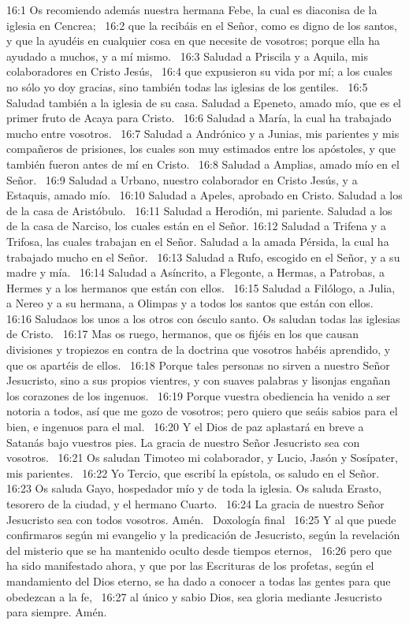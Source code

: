 16:1 Os recomiendo además nuestra hermana Febe, la cual es diaconisa de la iglesia en Cencrea;  
16:2 que la recibáis en el Señor, como es digno de los santos, y que la ayudéis en cualquier cosa en que necesite de vosotros; porque ella ha ayudado a muchos, y a mí mismo.  
16:3 Saludad a Priscila y a Aquila, mis colaboradores en Cristo Jesús,  
16:4 que expusieron su vida por mí; a los cuales no sólo yo doy gracias, sino también todas las iglesias de los gentiles.  
16:5 Saludad también a la iglesia de su casa. Saludad a Epeneto, amado mío, que es el primer fruto de Acaya para Cristo.  
16:6 Saludad a María, la cual ha trabajado mucho entre vosotros.  
16:7 Saludad a Andrónico y a Junias, mis parientes y mis compañeros de prisiones, los cuales son muy estimados entre los apóstoles, y que también fueron antes de mí en Cristo.  
16:8 Saludad a Amplias, amado mío en el Señor.  
16:9 Saludad a Urbano, nuestro colaborador en Cristo Jesús, y a Estaquis, amado mío.  
16:10 Saludad a Apeles, aprobado en Cristo. Saludad a los de la casa de Aristóbulo.  
16:11 Saludad a Herodión, mi pariente. Saludad a los de la casa de Narciso, los cuales están en el Señor. 
16:12 Saludad a Trifena y a Trifosa, las cuales trabajan en el Señor. Saludad a la amada Pérsida, la cual ha trabajado mucho en el Señor.  
16:13 Saludad a Rufo, escogido en el Señor, y a su madre y mía.  
16:14 Saludad a Asíncrito, a Flegonte, a Hermas, a Patrobas, a Hermes y a los hermanos que están con ellos.  
16:15 Saludad a Filólogo, a Julia, a Nereo y a su hermana, a Olimpas y a todos los santos que están con ellos.  
16:16 Saludaos los unos a los otros con ósculo santo. Os saludan todas las iglesias de Cristo.  
16:17 Mas os ruego, hermanos, que os fijéis en los que causan divisiones y tropiezos en contra de la doctrina que vosotros habéis aprendido, y que os apartéis de ellos.  
16:18 Porque tales personas no sirven a nuestro Señor Jesucristo, sino a sus propios vientres, y con suaves palabras y lisonjas engañan los corazones de los ingenuos.  
16:19 Porque vuestra obediencia ha venido a ser notoria a todos, así que me gozo de vosotros; pero quiero que seáis sabios para el bien, e ingenuos para el mal.  
16:20 Y el Dios de paz aplastará en breve a Satanás bajo vuestros pies. La gracia de nuestro Señor Jesucristo sea con vosotros.  
16:21 Os saludan Timoteo mi colaborador, y Lucio, Jasón y Sosípater, mis parientes.  
16:22 Yo Tercio, que escribí la epístola, os saludo en el Señor.  
16:23 Os saluda Gayo, hospedador mío y de toda la iglesia. Os saluda Erasto, tesorero de la ciudad, y el hermano Cuarto.  
16:24 La gracia de nuestro Señor Jesucristo sea con todos vosotros. Amén.  
Doxología final  
16:25 Y al que puede confirmaros según mi evangelio y la predicación de Jesucristo, según la revelación del misterio que se ha mantenido oculto desde tiempos eternos,  
16:26 pero que ha sido manifestado ahora, y que por las Escrituras de los profetas, según el mandamiento del Dios eterno, se ha dado a conocer a todas las gentes para que obedezcan a la fe,  
16:27 al único y sabio Dios, sea gloria mediante Jesucristo para siempre. Amén.  
